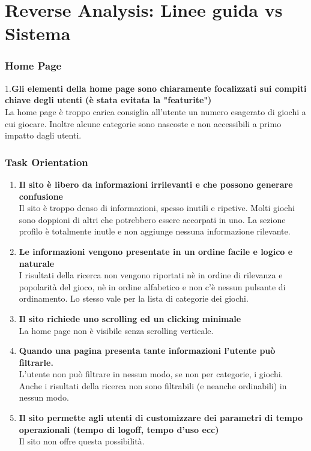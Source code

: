 \documentclass[../Report.tex]{subfiles}
\begin{document}
    \section{Reverse Analysis: Linee guida vs Sistema}
    \subsubsection{Home Page}
    1.\textbf{Gli elementi della home page sono chiaramente focalizzati sui compiti chiave degli utenti (è stata evitata la "featurite") }\\
    La home page è troppo carica consiglia all’utente un numero esagerato di giochi a cui giocare. Inoltre alcune categorie sono nascoste e non accessibili a primo impatto dagli utenti. 

    \subsubsection{Task Orientation}
    \begin{enumerate}
        \item \textbf{Il sito è libero da informazioni irrilevanti e che possono generare confusione}\\
            Il sito è troppo denso di informazioni, spesso inutili e ripetive. Molti giochi sono doppioni di altri che potrebbero essere accorpati in uno. La sezione profilo è totalmente inutle e non aggiunge nessuna informazione rilevante.  
        \item \textbf{Le informazioni vengono presentate in un ordine facile e logico e naturale}\\
        I risultati della ricerca non vengono riportati nè in ordine di rilevanza e popolarità del gioco, nè in ordine alfabetico e non c’è nessun pulsante di ordinamento. Lo stesso vale per la lista di categorie dei giochi. 
        \item \textbf{Il sito richiede uno scrolling ed un clicking minimale }\\
        La home page non è visibile senza scrolling verticale. 
        \item \textbf{Quando una pagina presenta tante informazioni l’utente può filtrarle.}\\
        L’utente non può filtrare in nessun modo, se non per categorie, i giochi. Anche i risultati della ricerca non sono filtrabili (e neanche ordinabili) in nessun modo.
        \item \textbf{Il sito permette agli utenti di customizzare dei parametri di tempo operazionali (tempo di logoff, tempo d’uso ecc)}\\
        Il sito non offre questa possibilità.
    \end{enumerate}
\end{document}
